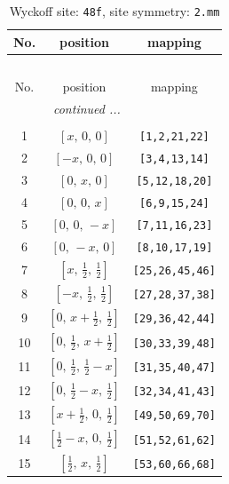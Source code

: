 \documentclass[fleqn,8pt]{jsarticle}
\begin{document}
\begin{longtable}{ccc}
\caption{Wyckoff site: {\tt 48f}, site symmetry: {\tt 2.mm}}
 \\
 \hline \hline
No. & position & mapping \\ \hline \endfirsthead

\multicolumn{2}{l}{\tablename\ \thetable{}} \\
 \hline \hline
No. & position & mapping \\ \hline \endhead

 \hline \hline
\multicolumn{2}{r}{\footnotesize\it continued ...} \\ \endfoot

 \hline \hline
\multicolumn{2}{r}{} \\ \endlastfoot

1 & $\left[ x,\, 0,\, 0 \right]$ & {\tt [1,2,21,22]} \\ \hline
2 & $\left[ - x,\, 0,\, 0 \right]$ & {\tt [3,4,13,14]} \\ \hline
3 & $\left[ 0,\, x,\, 0 \right]$ & {\tt [5,12,18,20]} \\ \hline
4 & $\left[ 0,\, 0,\, x \right]$ & {\tt [6,9,15,24]} \\ \hline
5 & $\left[ 0,\, 0,\, - x \right]$ & {\tt [7,11,16,23]} \\ \hline
6 & $\left[ 0,\, - x,\, 0 \right]$ & {\tt [8,10,17,19]} \\ \hline
7 & $\left[ x,\, \frac{1}{2},\, \frac{1}{2} \right]$ & {\tt [25,26,45,46]} \\ \hline
8 & $\left[ - x,\, \frac{1}{2},\, \frac{1}{2} \right]$ & {\tt [27,28,37,38]} \\ \hline
9 & $\left[ 0,\, x + \frac{1}{2},\, \frac{1}{2} \right]$ & {\tt [29,36,42,44]} \\ \hline
10 & $\left[ 0,\, \frac{1}{2},\, x + \frac{1}{2} \right]$ & {\tt [30,33,39,48]} \\ \hline
11 & $\left[ 0,\, \frac{1}{2},\, \frac{1}{2} - x \right]$ & {\tt [31,35,40,47]} \\ \hline
12 & $\left[ 0,\, \frac{1}{2} - x,\, \frac{1}{2} \right]$ & {\tt [32,34,41,43]} \\ \hline
13 & $\left[ x + \frac{1}{2},\, 0,\, \frac{1}{2} \right]$ & {\tt [49,50,69,70]} \\ \hline
14 & $\left[ \frac{1}{2} - x,\, 0,\, \frac{1}{2} \right]$ & {\tt [51,52,61,62]} \\ \hline
15 & $\left[ \frac{1}{2},\, x,\, \frac{1}{2} \right]$ & {\tt [53,60,66,68]} \\ \hline

\end{longtable}
\end{document}
